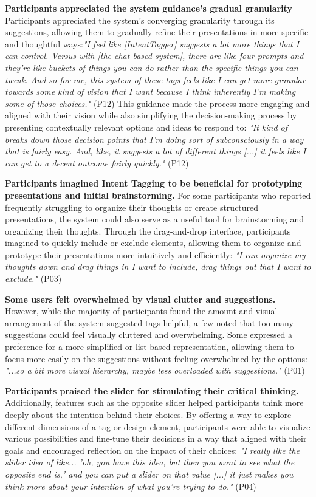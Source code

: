 \textbf{Participants appreciated the system guidance's gradual granularity}
Participants appreciated the system's converging granularity through its suggestions, allowing them to gradually refine their presentations in more specific and thoughtful ways:\textit{"I feel like [IntentTagger] suggests a lot more things that I can control. Versus with [the chat-based system], there are like four prompts and they're like buckets of things you can do rather than the specific things you can tweak. And so for me, this system of these tags feels like I can get more granular towards some kind of vision that I want because I think inherently I'm making some of those choices."} (P12)   
This guidance made the process more engaging and aligned with their vision while also simplifying the decision-making process by presenting contextually relevant options and ideas to respond to: \textit{"It kind of breaks down those decision points that I'm doing sort of subconsciously in a way that is fairly easy. And, like, it suggests a lot of different things [...] it feels like I can get to a decent outcome fairly quickly."} (P12)




\textbf{Participants imagined Intent Tagging to be beneficial for prototyping presentations and initial brainstorming.}
For some participants who reported frequently struggling to organize their thoughts or create structured presentations, the system could also serve as a useful tool for brainstorming and organizing their thoughts. Through the drag-and-drop interface, participants imagined to quickly include or exclude elements, allowing them to organize and prototype their presentations more intuitively and efficiently: \textit{"I can organize my thoughts down and drag things in I want to include, drag things out that I want to exclude."} (P03)

\textbf{Some users felt overwhelmed by visual clutter and suggestions.}
However, while the majority of participants found the amount and visual arrangement of the system-suggested tags helpful, a few noted that too many suggestions could feel visually cluttered and overwhelming. Some expressed a preference for a more simplified or list-based representation, allowing them to focus more easily on the suggestions without feeling overwhelmed by the options: \textit{"...so a bit more visual hierarchy, maybe less overloaded with suggestions."} (P01)




\textbf{Participants praised the slider for stimulating their critical thinking.}
Additionally, features such as the opposite slider helped participants think more deeply about the intention behind their choices. By offering a way to explore different dimensions of a tag or design element, participants were able to visualize various possibilities and fine-tune their decisions in a way that aligned with their goals and encouraged reflection on the impact of their choices: \textit{"I really like the slider idea of like... 'oh, you have this idea, but then you want to see what the opposite end is,' and you can put a slider on that value [...] it just makes you think more about your intention of what you're trying to do."} (P04)





